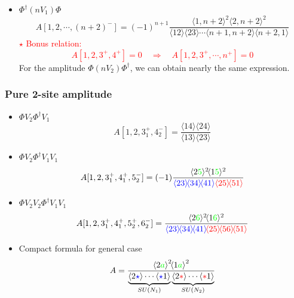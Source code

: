 \documentclass{beamer}
\newcommand{\avg}[1]{\langle #1 \rangle}
\newcommand{\mdavg}[2]{\langle #1 \rangle\!\langle #2 \rangle}
\newcommand{\asqu}[1]{{\langle#1\rangle}^2}
\begin{document}
\begin{frame}
    \begin{itemize}
        \item $\Phi^\dagger (nV_1)\Phi$
            \begin{equation*}
                A[1,2,\cdots,(n+2)^-]=(-1)^{n+1}\frac{\avg{1,n+2}^2\avg{2,n+2}^2}{\mdavg{12}{23}\cdots\mdavg{n+1,n+2}{n+2,1}}
            \end{equation*}
            \textcolor{red}{$\star$ Bonus relation: \begin{equation*}
                A[1,2,3^+,4^+]=0\quad \Rightarrow  \quad A[1,2,3^+,\cdots,n^+]=0 \end{equation*}}
        For the amplitude $\Phi (nV_2)\Phi^\dagger$, we can obtain nearly the same expression.
    \end{itemize}
\end{frame}

\begin{frame}
    \frametitle{Pure 2-site amplitude}
    \begin{itemize}
        \item $\Phi V_2 \Phi^\dagger V_1$
        \begin{equation*}
            A[1,2,3_1^+,4_2^-]=\frac{\mdavg{14}{24}}{\mdavg{13}{23}}
        \end{equation*}
        \item $\Phi V_2 \Phi^\dagger V_1V_1$
        \begin{equation*}
            A[1,2,3_1^+,4_1^+,5_2^-]=(-1)\frac{\avg{2\textcolor{green}{5}}^2\!\avg{1\textcolor{green}{5}}^2}{\textcolor{blue}{\mdavg{23}{34}\!\avg{41}}\textcolor{red}{\mdavg{25}{51}}}
        \end{equation*}
        \item $\Phi V_2V_2 \Phi^\dagger V_1V_1$
        \begin{equation*}
            A[1,2,3_1^+,4_1^+,5_2^+,6_2^-]=\frac{\avg{2\textcolor{green}{6}}^2\!\avg{1\textcolor{green}{6}}^2}{\textcolor{blue}{\mdavg{23}{34}\!\avg{41}}\!\textcolor{red}{\mdavg{25}{56}\!\avg{51}}}
        \end{equation*}       
    \end{itemize}
\end{frame}

\begin{frame}
    \begin{itemize}
        \item Compact formula for general case
        \begin{equation*}
            A=\frac{\asqu{2\textcolor{green}{a}}\!\asqu{1\textcolor{green}{a}}}{\underbrace{\avg{2\textcolor{blue}{\star}}\cdots \avg{\textcolor{blue}{\star}1}}_{SU(N_1)}\underbrace{\avg{2\textcolor{red}{\ast} }\cdots \avg{\textcolor{red}{\ast} 1}}_{SU(N_2)}}
        \end{equation*} 
    \end{itemize}
\end{frame}
\end{document}
